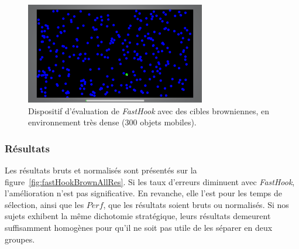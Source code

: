 	\begin{figure}[htbp]
		\centering
		\includegraphics[width=0.7\textwidth]{figures/ch5/pseudohaptics_brown}
		\caption[\emph{FastHook} avec cibles browniennes]{Dispositif d'évaluation de \emph{FastHook} avec des cibles browniennes, en environnement très dense (300 objets mobiles).}
		\label{fig:pseudohaptics_brown}
	\end{figure}

	
	\subsubsection{Résultats}
	Les résultats bruts et normalisés sont présentés sur la figure~\ref{fig:fastHookBrownAllRes}. Si les taux d'erreurs diminuent avec \emph{FastHook}, l'amélioration n'est pas significative. En revanche, elle l'est pour les temps de sélection, ainsi que les $Perf$, que les résultats soient bruts ou normalisés. Si nos sujets exhibent la même dichotomie stratégique, leurs résultats demeurent suffisamment homogènes pour qu'il ne soit pas utile de les séparer en deux groupes.
	
